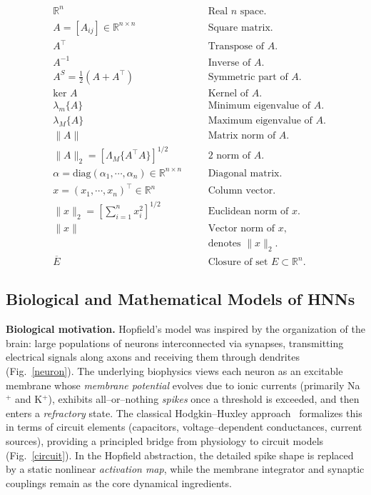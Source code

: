 \documentclass[journal]{IEEEtran}
\begin{document}
\begin{align*}
&\mathbb{R}^n &\quad&\text{Real } n \text{ space.}\\
&A = [A_{ij}] \in \mathbb{R}^{n \times n} &\quad&\text{Square matrix.}\\
&A^{\top} &\quad&\text{Transpose of } A.\\
&A^{-1} &\quad&\text{Inverse of } A.\\
&A^S = \tfrac{1}{2}(A + A^{\top}) &\quad&\text{Symmetric part of } A.\\
&\text{ker } A &\quad&\text{Kernel of } A.\\
&\lambda_m\{A\} &\quad&\text{Minimum eigenvalue of } A.\\
&\lambda_M\{A\} &\quad&\text{Maximum eigenvalue of } A.\\
&\|A\| &\quad&\text{Matrix norm of } A.\\
&\|A\|_2 = [\Lambda_M\{A^{\top}A\}]^{1/2} &\quad&2 \text{ norm of } A.\\
&\alpha = \text{diag}(\alpha_1, \cdots, \alpha_n) \in \mathbb{R}^{n \times n} &\quad&\text{Diagonal matrix.}\\ 
&x = (x_1, \cdots, x_n)^{\top} \in \mathbb{R}^n &\quad&\text{Column vector.}\\
&\|x\|_2 = \left[\sum_{i=1}^n x_i^2\right]^{1/2} &\quad&\text{Euclidean norm of } x.\\
&\|x\| &\quad&\text{Vector norm of } x \text{,}\\
& & &\text{denotes }\|x\|_2.\\
&\overline{E} &\quad&\text{Closure of set } E \subset \mathbb{R}^n.
\end{align*}



\subsection{Biological and Mathematical Models of HNNs}\label{sec:biomath}

\textbf{Biological motivation.}
Hopfield’s model was inspired by the organization of the brain: 
large populations of neurons interconnected via synapses, 
transmitting electrical signals along axons and receiving them through dendrites (Fig.~\ref{neuron}). 
The underlying biophysics views each neuron as an excitable membrane whose \emph{membrane potential} 
evolves due to ionic currents (primarily Na$^+$ and K$^+$), 
exhibits all–or–nothing \emph{spikes} once a threshold is exceeded, 
and then enters a \emph{refractory} state. 
The classical Hodgkin–Huxley approach~\cite{p224} formalizes this in terms of circuit elements 
(capacitors, voltage–dependent conductances, current sources), 
providing a principled bridge from physiology to circuit models (Fig.~\ref{circuit}). 
In the Hopfield abstraction, the detailed spike shape is replaced 
by a static nonlinear \emph{activation map}, 
while the membrane integrator and synaptic couplings remain 
as the core dynamical ingredients.
\end{document}
